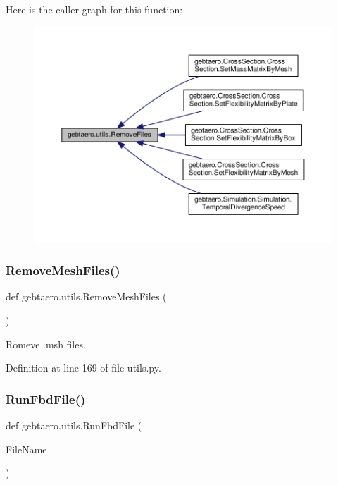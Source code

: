 Here is the caller graph for this function\+:
\nopagebreak
\begin{figure}[H]
\begin{center}
\leavevmode
\includegraphics[width=350pt]{namespacegebtaero_1_1utils_a14f397a623bb26fcf8b4dcd64228aa05_icgraph}
\end{center}
\end{figure}
\mbox{\label{namespacegebtaero_1_1utils_a8f7dd7932f9ad411a1b153e1e17a4c62}} 
\subsubsection{\texorpdfstring{Remove\+Mesh\+Files()}{RemoveMeshFiles()}}
{\footnotesize\ttfamily def gebtaero.\+utils.\+Remove\+Mesh\+Files (\begin{DoxyParamCaption}{ }\end{DoxyParamCaption})}



Romeve .msh files. 



Definition at line 169 of file utils.\+py.

\mbox{\label{namespacegebtaero_1_1utils_a37d973efabdd0beca6418265ffa57d32}} 
\subsubsection{\texorpdfstring{Run\+Fbd\+File()}{RunFbdFile()}}
{\footnotesize\ttfamily def gebtaero.\+utils.\+Run\+Fbd\+File (\begin{DoxyParamCaption}\item[{}]{File\+Name }\end{DoxyParamCaption})}




